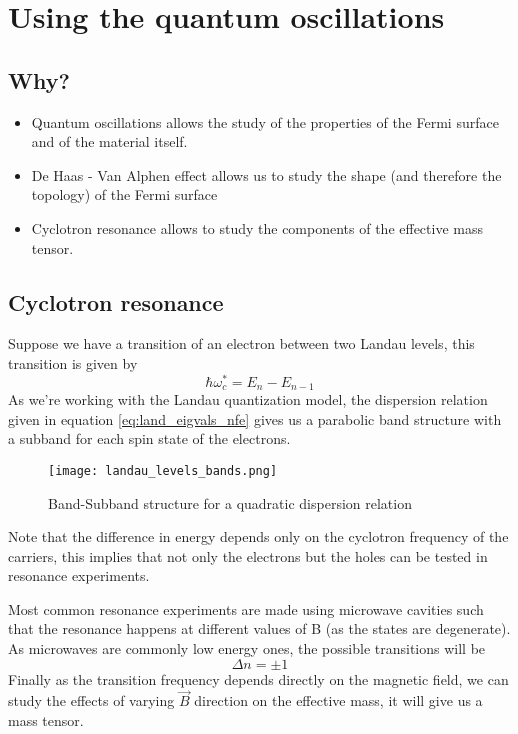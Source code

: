 \documentclass{beamer}
\begin{document}
\section{Using the quantum oscillations}
\subsection{Why?}
\begin{frame}
\begin{itemize}
    \item Quantum oscillations allows the study of the properties of the Fermi surface and of the material itself. 
    \item De Haas - Van Alphen effect allows us to study the shape (and therefore the topology) of the Fermi surface
    \item Cyclotron resonance allows to study the components of the effective mass tensor.
\end{itemize}

\end{frame}
\subsection{Cyclotron resonance}
\begin{frame}
  Suppose we have a transition of an electron between two Landau levels, this transition is given by
  \begin{equation}
      \hbar \omega_c ^*= E_n - E_{n-1}
      \label{eq:dif}
  \end{equation}
  As we're working with the Landau quantization model, the dispersion relation given in equation \ref{eq:land_eigvals_nfe} gives us a parabolic band structure with a subband for each spin state of the electrons.
  
\end{frame}
\begin{frame}
  \begin{figure}
      \centering
      \texttt{[image: landau\_levels\_bands.png]}
      \caption{Band-Subband structure for a quadratic dispersion relation}
      \label{fig:my_label}
  \end{figure}
\end{frame}
\begin{frame}
  Note that the difference in energy depends only on the cyclotron frequency of the carriers, this implies that not only the electrons but the holes can be tested in resonance experiments.
  
  Most common resonance experiments are made using microwave cavities such that the resonance happens at different values of B (as the states are degenerate). As microwaves are commonly low energy ones, the possible transitions will be 
  \begin{equation}
      \Delta n=\pm 1
  \end{equation}
Finally as the transition frequency depends directly on the magnetic field, we can study the effects of varying $\vec{B}$ direction on the effective mass, it will give us a mass tensor\cite{dresselhaus}.
\end{frame}
\end{document}
